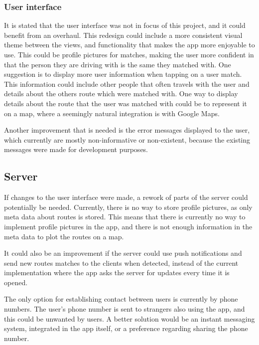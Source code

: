 \subsubsection*{User interface}
It is stated that the user interface was not in focus of this project, and it could benefit from an overhaul.
This redesign could include a more consistent visual theme between the views, and functionality that makes the app more enjoyable to use.
This could be profile pictures for matches, making the user more confident in that the person they are driving with is the same they matched with.
One suggestion is to display more user information when tapping on a user match.
This information could include other people that often travels with the user and details about the others route which were matched with.
One way to display details about the route that the user was matched with could be to represent it on a map, where a seemingly natural integration is with Google Maps.

Another improvement that is needed is the error messages displayed to the user, which currently are mostly non-informative or non-existent, because the existing messages were made for development purposes.

\subsection{Server}
If changes to the user interface were made, a rework of parts of the server could potentially be needed.
Currently, there is no way to store profile pictures, as only meta data about routes is stored.
This means that there is currently no way to implement profile pictures in the app, and there is not enough information in the meta data to plot the routes on a map.

It could also be an improvement if the server could use push notifications and send new routes matches to the clients when detected, instead of the current implementation where the app asks the server for updates every time it is opened.

The only option for establishing contact between users is currently by phone numbers.
The user's phone number is sent to strangers also using the app, and this could be unwanted by users.
A better solution would be an instant messaging system, integrated in the app itself, or a preference regarding sharing the phone number.

